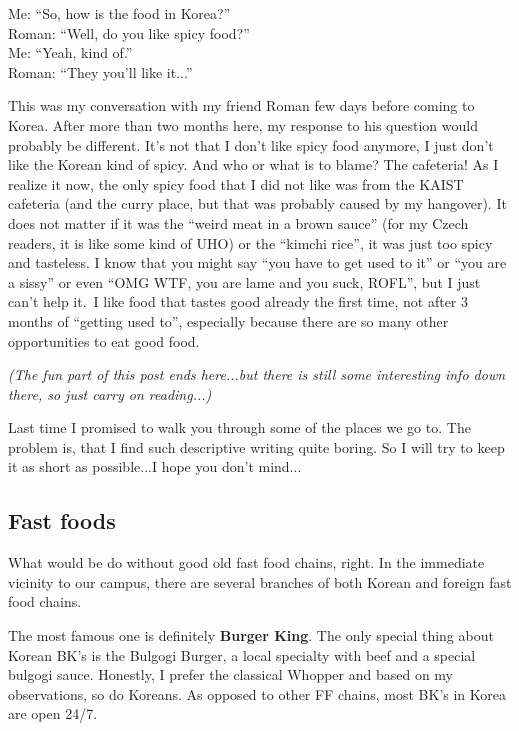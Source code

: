 \begin{post}
	\begin{content}
\begin{blockquote}Me: ``So, how is the food in Korea?''\\
Roman: ``Well, do you like spicy food?''\\
Me: ``Yeah, kind of.''\\
Roman: ``They you'll like it...''\end{blockquote}

This was my conversation with my friend Roman few days before coming to Korea. After more than two months here, my response to his question would probably be different. It's not that I don't like spicy food anymore, I just don't like the Korean kind of spicy. And who or what is to blame? The cafeteria! As I realize it now, the only spicy food that I did not like was from the KAIST cafeteria (and the curry place, but that was probably caused by my hangover). It does not matter if it was the ``weird meat in a brown sauce'' (for my Czech readers, it is like some kind of UHO) or the ``kimchi rice'', it was just too spicy and tasteless. I know that you might say ``you have to get used to it'' or ``you are a sissy'' or even ``OMG WTF, you are lame and you suck, ROFL'', but I just can't help it. I like food that tastes good already the first time, not after 3 months of ``getting used to'', especially because there are so many other opportunities to eat good food.

\textit{(The fun part of this post ends here...but there is still some interesting info down there, so just carry on reading...)}

Last time I promised to walk you through some of the places we go to. The problem is, that I find such descriptive writing quite boring. So I will try to keep it as short as possible...I hope you don't mind...

\subsection{Fast foods}
What would be do without good old fast food chains, right. In the immediate vicinity to our campus, there are several branches of both Korean and foreign fast food chains.

The most famous one is definitely \textbf{Burger King}. The only special thing about Korean BK's is the Bulgogi Burger, a local specialty with beef and a special bulgogi sauce. Honestly, I prefer the classical Whopper and based on my observations, so do Koreans. As opposed to other FF chains, most BK's in Korea are open 24/7.


\end{content}
\end{post}

